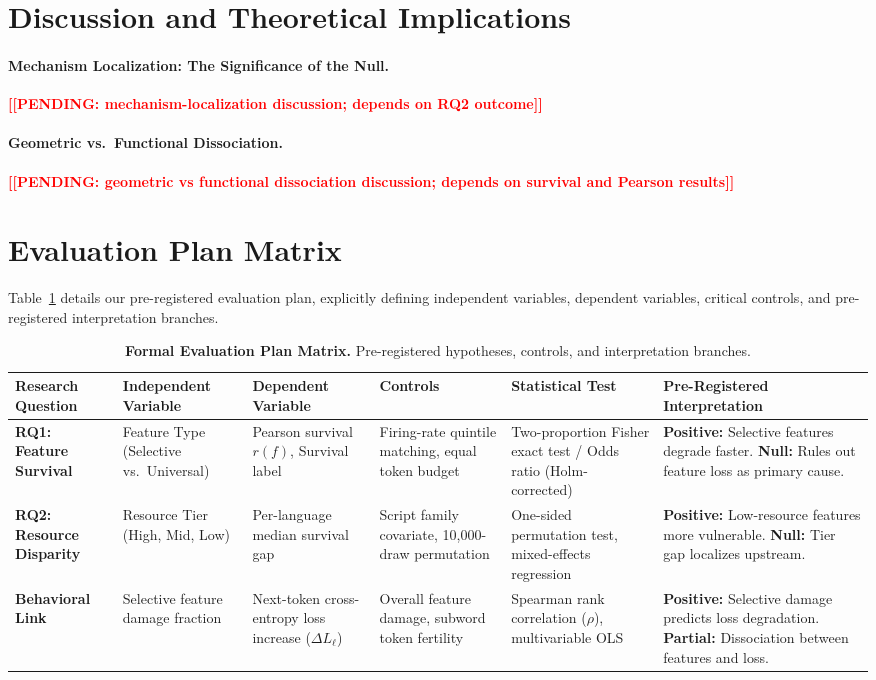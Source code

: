 \documentclass[11pt]{article}
\newcommand{\TODO}[1]{\textbf{\textcolor{red}{[[#1]]}}}
\begin{document}
\section{Discussion and Theoretical Implications}

\paragraph{Mechanism Localization: The Significance of the Null.}
\TODO{PENDING: mechanism-localization discussion; depends on RQ2 outcome}

\paragraph{Geometric vs.\ Functional Dissociation.}
\TODO{PENDING: geometric vs functional dissociation discussion; depends on survival and Pearson results}

\section{Evaluation Plan Matrix}
Table~\ref{tab:eval_plan} details our pre-registered evaluation plan, explicitly defining independent variables, dependent variables, critical controls, and pre-registered interpretation branches.

\begin{table}[t]
\centering
\small
\begin{tabularx}{\textwidth}{lXXXXX}
\toprule
\textbf{Research Question} & \textbf{Independent Variable} & \textbf{Dependent Variable} & \textbf{Controls} & \textbf{Statistical Test} & \textbf{Pre-Registered Interpretation} \\
\midrule
\textbf{RQ1: Feature Survival} & Feature Type (Selective vs.\ Universal) & Pearson survival $r(f)$, Survival label & Firing-rate quintile matching, equal token budget & Two-proportion Fisher exact test / Odds ratio (Holm-corrected) & \textbf{Positive:} Selective features degrade faster. \newline \textbf{Null:} Rules out feature loss as primary cause. \\
\midrule
\textbf{RQ2: Resource Disparity} & Resource Tier (High, Mid, Low) & Per-language median survival gap & Script family covariate, 10,000-draw permutation & One-sided permutation test, mixed-effects regression & \textbf{Positive:} Low-resource features more vulnerable. \newline \textbf{Null:} Tier gap localizes upstream. \\
\midrule
\textbf{Behavioral Link} & Selective feature damage fraction & Next-token cross-entropy loss increase ($\Delta L_\ell$) & Overall feature damage, subword token fertility & Spearman rank correlation ($\rho$), multivariable OLS & \textbf{Positive:} Selective damage predicts loss degradation. \newline \textbf{Partial:} Dissociation between features and loss. \\
\bottomrule
\end{tabularx}
\caption{\textbf{Formal Evaluation Plan Matrix.} Pre-registered hypotheses, controls, and interpretation branches.}
\label{tab:eval_plan}
\end{table}
\end{document}
